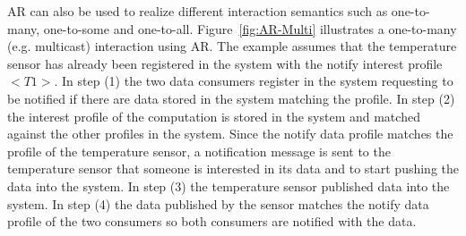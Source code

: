 AR can also be used to realize different interaction semantics such as one-to-many, one-to-some and one-to-all. Figure~\ref{fig:AR-Multi} illustrates a one-to-many (e.g. multicast) interaction using AR. The example assumes that the temperature sensor has already been registered in the system with the notify interest profile $<T1>$. In step (1) the two data consumers register in the system requesting to be notified if there are data stored in the system matching the profile. In step (2) the interest profile of the computation is stored in the system and matched against the other profiles in the system. Since the notify data profile matches the profile of the temperature sensor, a notification message is sent to the temperature sensor that someone is interested in its data and to start pushing the data into the system. In step (3) the temperature sensor published data into the system. In step (4) the data published by the sensor matches the notify data profile of the two consumers so both consumers are notified with the data.

